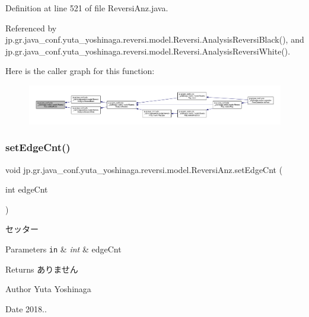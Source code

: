 Definition at line 521 of file Reversi\+Anz.\+java.



Referenced by jp.\+gr.\+java\+\_\+conf.\+yuta\+\_\+yoshinaga.\+reversi.\+model.\+Reversi.\+Analysis\+Reversi\+Black(), and jp.\+gr.\+java\+\_\+conf.\+yuta\+\_\+yoshinaga.\+reversi.\+model.\+Reversi.\+Analysis\+Reversi\+White().

Here is the caller graph for this function\+:
\nopagebreak
\begin{figure}[H]
\begin{center}
\leavevmode
\includegraphics[width=350pt]{classjp_1_1gr_1_1java__conf_1_1yuta__yoshinaga_1_1reversi_1_1model_1_1_reversi_anz_a1e959a8fa487358c94b7615bdb589e30_icgraph}
\end{center}
\end{figure}
\mbox{\label{classjp_1_1gr_1_1java__conf_1_1yuta__yoshinaga_1_1reversi_1_1model_1_1_reversi_anz_aab3651918ed96bd47b03f79ff14f9bec}} 
\subsubsection{\texorpdfstring{set\+Edge\+Cnt()}{setEdgeCnt()}}
{\footnotesize\ttfamily void jp.\+gr.\+java\+\_\+conf.\+yuta\+\_\+yoshinaga.\+reversi.\+model.\+Reversi\+Anz.\+set\+Edge\+Cnt (\begin{DoxyParamCaption}\item[{int}]{edge\+Cnt }\end{DoxyParamCaption})}



セッター 


\begin{DoxyParams}[1]{Parameters}
\mbox{\tt in}  & {\em int} & edge\+Cnt \\
\hline
\end{DoxyParams}
\begin{DoxyReturn}{Returns}
ありません 
\end{DoxyReturn}
\begin{DoxyAuthor}{Author}
Yuta Yoshinaga 
\end{DoxyAuthor}
\begin{DoxyDate}{Date}
2018.. 
\end{DoxyDate}


